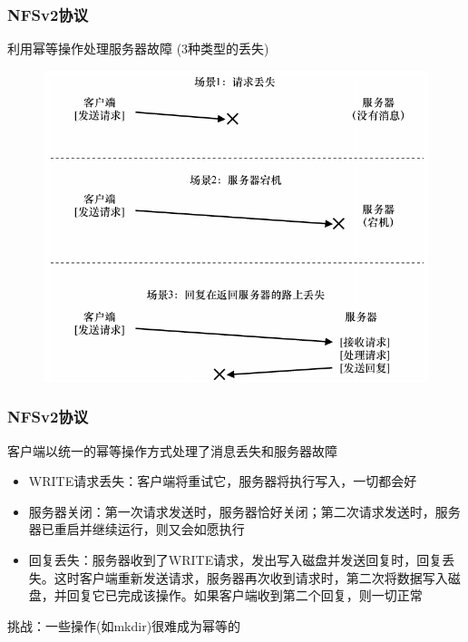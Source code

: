 \begin{frame}[fragile]
    \frametitle{NFSv2协议}
    利用幂等操作处理服务器故障 (3种类型的丢失)
    \begin{figure}
        \includegraphics[width=0.5\linewidth]{figs/nfsv2-lose.png}
    \end{figure}
    
\end{frame}

\begin{frame}[fragile]
    \frametitle{NFSv2协议}
    客户端以统一的幂等操作方式处理了消息丢失和服务器故障
    
    \begin{itemize}
        \item WRITE请求丢失：客户端将重试它，服务器将执行写入，一切都会好
        \item 服务器关闭：第一次请求发送时，服务器恰好关闭；第二次请求发送时，服务器已重启并继续运行，则又会如愿执行
        \item 回复丢失：服务器收到了WRITE请求，发出写入磁盘并发送回复时，回复丢失。这时客户端重新发送请求，服务器再次收到请求时，第二次将数据写入磁盘，并回复它已完成该操作。如果客户端收到第二个回复，则一切正常
    \end{itemize}
    挑战：{\color{blue}一些操作(如mkdir)很难成为幂等的}
    
\end{frame}

